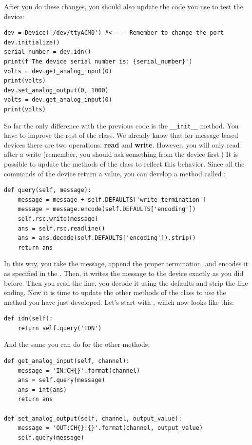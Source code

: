After you do these changes, you should also update the code you use to test the device:

\begin{verbatim}
dev = Device('/dev/ttyACM0') #<---- Remember to change the port
dev.initialize()
serial_number = dev.idn()
print(f'The device serial number is: {serial_number}')
volts = dev.get_analog_input(0)
print(volts)
dev.set_analog_output(0, 1000)
volts = dev.get_analog_input(0)
print(volts)
\end{verbatim}

\sloppy So far the only difference with the previous code is the \texttt{__init__} method. You have to improve the rest of the class. We already know that for message-based devices there are two operations: \textbf{read} and \textbf{write}. However, you will only read after a write (remember, you should ask something from the device first.) It is possible to update the methods of the class to reflect this behavior. Since all the commands of the device return a value, you can develop a method called :

\begin{verbatim}
def query(self, message):
    message = message + self.DEFAULTS['write_termination']
    message = message.encode(self.DEFAULTS['encoding'])
    self.rsc.write(message)
    ans = self.rsc.readline()
    ans = ans.decode(self.DEFAULTS['encoding']).strip()
    return ans
\end{verbatim}

In this way, you take the message, append the proper termination, and encodes it as specified in the . Then, it writes the message to the
device exactly as you did before. Then you read the line, you decode it using the defaults and strip the line ending. Now it is time to update the other methods of the class to use the  method you have just developed. Let's start with , which now looks like this:

\begin{verbatim}
def idn(self):
    return self.query('IDN')
\end{verbatim}

And the same you can do for the other methods:

\begin{verbatim}
def get_analog_input(self, channel):
    message = 'IN:CH{}'.format(channel)
    ans = self.query(message)
    ans = int(ans)
    return ans

def set_analog_output(self, channel, output_value):
    message = 'OUT:CH{}:{}'.format(channel, output_value)
    self.query(message)
\end{verbatim}

